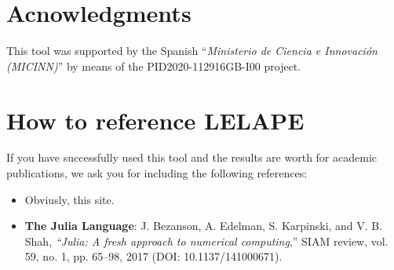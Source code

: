 \section{Acnowledgments}
%
This tool was supported by the Spanish ``\textit{Ministerio de Ciencia e Innovación (MICINN)}'' by means of the PID2020-112916GB-I00 project.
\section{How to reference LELAPE}
%
If you have successfully used this tool and the results are worth for academic publications, we ask you for including the following references:
\begin{itemize}
	\item Obviusly, this site.
	\item \textbf{The Julia Language}: J. Bezanson, A. Edelman, S. Karpinski, and V. B. Shah, \textit{“Julia: A fresh approach to numerical computing},” SIAM review, vol. 59, no. 1, pp. 65–98, 2017 (DOI: 10.1137/141000671).
\end{itemize}

